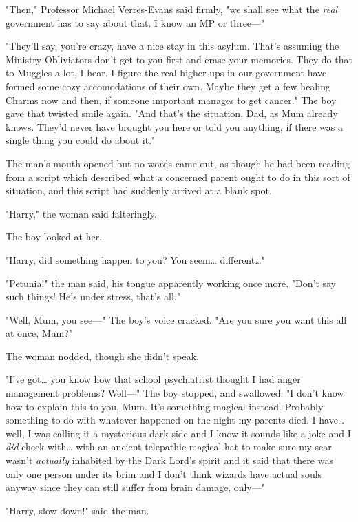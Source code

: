 "Then," Professor Michael Verres-Evans said firmly, "we shall see what the
\emph{real} government has to say about that. I know an MP or three---"

"They'll say, you're crazy, have a nice stay in this asylum. That's assuming
the Ministry Obliviators don't get to you first and erase your memories. They
do that to Muggles a lot, I hear. I figure the real higher-ups in our
government have formed some cozy accomodations of their own. Maybe they get a
few healing Charms now and then, if someone important manages to get cancer."
The boy gave that twisted smile again. "And that's the situation, Dad, as Mum
already knows. They'd never have brought you here or told you anything, if
there was a single thing you could do about it."

The man's mouth opened but no words came out, as though he had been reading
from a script which described what a concerned parent ought to do in this sort
of situation, and this script had suddenly arrived at a blank spot.

"Harry," the woman said falteringly.

The boy looked at her.

"Harry, did something happen to you? You seem{\ldots} different{\ldots}"

"Petunia!" the man said, his tongue apparently working once more. "Don't say
such things! He's under stress, that's all."

"Well, Mum, you see---" The boy's voice cracked. "Are you sure you want this
all at once, Mum?"

The woman nodded, though she didn't speak.

"I've got{\ldots} you know how that school psychiatrist thought I had anger
management problems? Well---" The boy stopped, and swallowed. "I don't know how
to explain this to you, Mum. It's something magical instead. Probably something
to do with whatever happened on the night my parents died. I have{\ldots} well,
I was calling it a mysterious dark side and I know it sounds like a joke and I
\emph{did} check with{\ldots} with an ancient telepathic magical hat to make
sure my scar wasn't \emph{actually} inhabited by the Dark Lord's spirit and it
said that there was only one person under its brim and I don't think wizards
have actual souls anyway since they can still suffer from brain damage, only---"

"Harry, slow down!" said the man.

